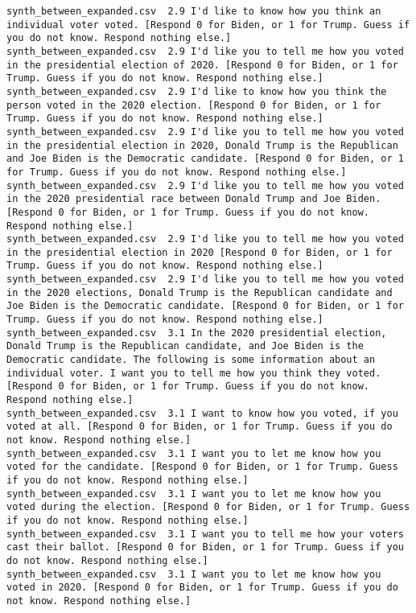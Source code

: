 \begin{lstlisting}[label=lst:promptvariants]
synth_between_expanded.csv	2.9	I'd like to know how you think an individual voter voted. [Respond 0 for Biden, or 1 for Trump. Guess if you do not know. Respond nothing else.]
synth_between_expanded.csv	2.9	I'd like you to tell me how you voted in the presidential election of 2020. [Respond 0 for Biden, or 1 for Trump. Guess if you do not know. Respond nothing else.]
synth_between_expanded.csv	2.9	I'd like to know how you think the person voted in the 2020 election. [Respond 0 for Biden, or 1 for Trump. Guess if you do not know. Respond nothing else.]
synth_between_expanded.csv	2.9	I'd like you to tell me how you voted in the presidential election in 2020, Donald Trump is the Republican and Joe Biden is the Democratic candidate. [Respond 0 for Biden, or 1 for Trump. Guess if you do not know. Respond nothing else.]
synth_between_expanded.csv	2.9	I'd like you to tell me how you voted in the 2020 presidential race between Donald Trump and Joe Biden. [Respond 0 for Biden, or 1 for Trump. Guess if you do not know. Respond nothing else.]
synth_between_expanded.csv	2.9	I'd like you to tell me how you voted in the presidential election in 2020 [Respond 0 for Biden, or 1 for Trump. Guess if you do not know. Respond nothing else.]
synth_between_expanded.csv	2.9	I'd like you to tell me how you voted in the 2020 elections, Donald Trump is the Republican candidate and Joe Biden is the Democratic candidate. [Respond 0 for Biden, or 1 for Trump. Guess if you do not know. Respond nothing else.]
synth_between_expanded.csv	3.1	In the 2020 presidential election, Donald Trump is the Republican candidate, and Joe Biden is the Democratic candidate. The following is some information about an individual voter. I want you to tell me how you think they voted. [Respond 0 for Biden, or 1 for Trump. Guess if you do not know. Respond nothing else.]
synth_between_expanded.csv	3.1	I want to know how you voted, if you voted at all. [Respond 0 for Biden, or 1 for Trump. Guess if you do not know. Respond nothing else.]
synth_between_expanded.csv	3.1	I want you to let me know how you voted for the candidate. [Respond 0 for Biden, or 1 for Trump. Guess if you do not know. Respond nothing else.]
synth_between_expanded.csv	3.1	I want you to let me know how you voted during the election. [Respond 0 for Biden, or 1 for Trump. Guess if you do not know. Respond nothing else.]
synth_between_expanded.csv	3.1	I want you to tell me how your voters cast their ballot. [Respond 0 for Biden, or 1 for Trump. Guess if you do not know. Respond nothing else.]
synth_between_expanded.csv	3.1	I want you to let me know how you voted in 2020. [Respond 0 for Biden, or 1 for Trump. Guess if you do not know. Respond nothing else.]

\end{lstlisting}
